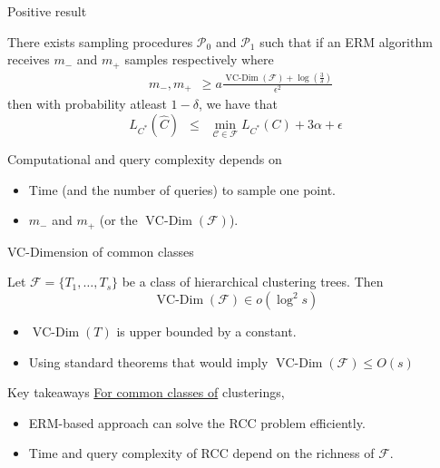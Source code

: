 \documentclass{beamer}
\newcommand{\mc}{\mathcal}
\DeclareMathOperator*{\vcdim}{VC-Dim}
\begin{document}
\begin{frame}[label=RCCPositive]{Positive result}
	\begin{block}{}
		There exists sampling procedures \hyperlink{detailsRCCNegative}{$\mc P_0$} and \hyperlink{detailsRCCPositive}{$\mc P_1$} such that if an ERM algorithm receives $m_-$ and $m_+$ samples respectively where
		\vspace{-10pt}\begin{align*}
		  &m_-, m_+ \enspace \ge a\frac{\vcdim({\mc F}) + \log(\frac{3}{\delta})}{\epsilon^2} 
		\end{align*}
		then with probability atleast $1-\delta$, we have that $$L_{C^*}(\hat C) \enspace\le\enspace \min_{\mc C \in \mc F} L_{C^*}(C) + 3\alpha + \epsilon$$
	\end{block}

	\vspace{10pt}Computational and query complexity depends on
	\begin{itemize}
		\vspace{5pt}\item Time (and the number of queries) to  \alert{sample one point}. 
		\vspace{5pt}\item $m_-$ and $m_+$ (or the \alert{$\vcdim(\mc F)$}). 
	\end{itemize}		
\end{frame}



\begin{frame}[label=RCCVCDim]{VC-Dimension of common classes}
	\begin{block}{}
		Let \hyperlink{detailsRCCVCDim}{$\mc F = \{T_1, \ldots, T_s\}$} be a class of hierarchical clustering trees. Then 
		$$\vcdim({\mc F}) \in o(\log^2 s) $$
	\end{block}
	
	\begin{itemize}
		\vspace{20pt}\item $\vcdim(T)$ is upper bounded by a constant.
		\vspace{10pt}\item Using standard theorems that would imply $\vcdim(\mc F) \le O(s)$
	\end{itemize}
\end{frame}

\begin{frame}[label=CCTakeaways]{Key takeaways}
	\hyperlink{notesCCTakeaways}{For common classes of} clusterings, 
	\begin{itemize}
		\vspace{20pt}\item ERM-based approach can solve the RCC problem efficiently. 
		\vspace{15pt}\item Time and query complexity of RCC depend on the richness of $\mc F$.
	\end{itemize}
\end{frame}
\end{document}
